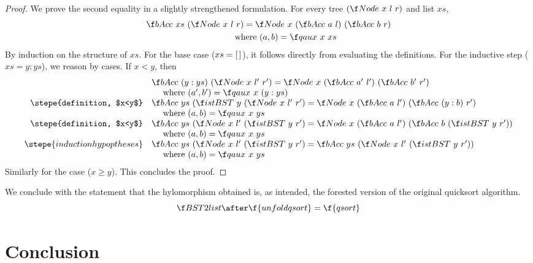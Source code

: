 \documentclass[a4paper,11pt]{llncs}
\begin{document}
\begin{proof}
We prove the second equality in a slightly strengthened formulation.
For every tree $(\Node\ x\ l\ r)$ and list $xs$,
\begin{gather*}
 \buildBSTacc\ xs\ (\Node\ x\ l\ r)
= \Node\ x\ (\buildBSTacc\ a\ l)\ (\buildBSTacc\ b\ r) \\
\qquad\qquad\text{where } (a,b) = \qaux\ x\ xs
\end{gather*}
By induction on the structure of $xs$. For the base case ($xs=[\,]$),
it follows directly from evaluating the definitions. For the inductive
step ($xs=y:ys$), we reason by cases. If $x<y$, then
\[
  \begin{array}{rl}
    & \buildBSTacc\ (y:ys)\ (\Node\ x\ l'\ r') =
    \Node\ x\ (\buildBSTacc\ a'\ l')\ (\buildBSTacc\ b'\ r') \\
    &\quad\mbox{ where } (a',b') = \qaux\ x\ (y:ys) \\
    \stepe{definition, $x<y$}
    & \buildBSTacc\ ys\ (\istBST\ y\ (\Node\ x\ l'\ r') =
    \Node\ x\ (\buildBSTacc\ a\ l')\ (\buildBSTacc\ (y:b)\ r') \\
    &\quad\mbox{ where } (a,b) = \qaux\ x\ ys \\
    \stepe{definition, $x<y$}
    & \buildBSTacc\ ys\ (\Node\ x\ l'\ (\istBST\ y\ r') =
    \Node\ x\ (\buildBSTacc\ a\ l')\ (\buildBSTacc\ b\ (\istBST\ y\ r')) \\
    &\quad\mbox{ where } (a,b) = \qaux\ x\ ys \\
    \stepe{induction hypoptheses}
    & \buildBSTacc\ ys\ (\Node\ x\ l'\ (\istBST\ y\ r') =
    \buildBSTacc\ ys\ (\Node\ x\ l'\ (\istBST\ y\ r')) \\
    &\quad\mbox{ where } (a,b) = \qaux\ x\ ys \\
  \end{array}
\]
Similarly for the case ($x\geq y$).  This concludes the proof.

\end{proof}

We conclude with the statement that the hylomorphism obtained is, as
intended, the forested version of the original quicksort algorithm.
\[ \BST2list\after\f{unfoldqsort} = \f{qsort} \]




\section{Conclusion}
\label{sec:con}
\end{document}
